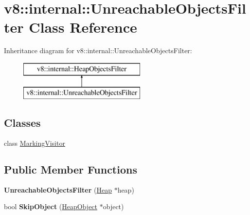 \hypertarget{classv8_1_1internal_1_1_unreachable_objects_filter}{}\section{v8\+:\+:internal\+:\+:Unreachable\+Objects\+Filter Class Reference}
\label{classv8_1_1internal_1_1_unreachable_objects_filter}
Inheritance diagram for v8\+:\+:internal\+:\+:Unreachable\+Objects\+Filter\+:\begin{figure}[H]
\begin{center}
\leavevmode
\includegraphics[height=2.000000cm]{classv8_1_1internal_1_1_unreachable_objects_filter}
\end{center}
\end{figure}
\subsection*{Classes}
\begin{DoxyCompactItemize}
\item 
class \hyperlink{classv8_1_1internal_1_1_unreachable_objects_filter_1_1_marking_visitor}{Marking\+Visitor}
\end{DoxyCompactItemize}
\subsection*{Public Member Functions}
\begin{DoxyCompactItemize}
\item 
{\bfseries Unreachable\+Objects\+Filter} (\hyperlink{classv8_1_1internal_1_1_heap}{Heap} $\ast$heap)\hypertarget{classv8_1_1internal_1_1_unreachable_objects_filter_aa41ea2a94721a16c89fba4d7a099d83b}{}\label{classv8_1_1internal_1_1_unreachable_objects_filter_aa41ea2a94721a16c89fba4d7a099d83b}

\item 
bool {\bfseries Skip\+Object} (\hyperlink{classv8_1_1internal_1_1_heap_object}{Heap\+Object} $\ast$object)\hypertarget{classv8_1_1internal_1_1_unreachable_objects_filter_aa80dfb5f48887950b3b87d6ace11cbd6}{}\label{classv8_1_1internal_1_1_unreachable_objects_filter_aa80dfb5f48887950b3b87d6ace11cbd6}

\end{DoxyCompactItemize}
